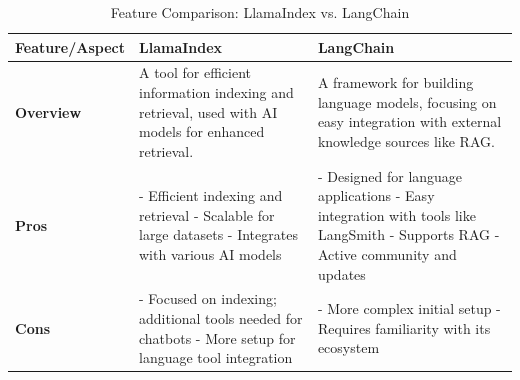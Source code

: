 \begin{table}[H]
\label{tab:FC}
\begin{center}
\caption{Feature Comparison: LlamaIndex vs. LangChain}
\begin{tabular}{|l|p{5cm}|p{5cm}|}
\hline
 \rowcolor[gray]{0.8} \textbf{Feature/Aspect} & \textbf{LlamaIndex} & \textbf{LangChain} \\
\hline
\textbf{Overview} & A tool for efficient information indexing and retrieval, used with AI models for enhanced retrieval. & A framework for building language models, focusing on easy integration with external knowledge sources like RAG. \\
\hline
\textbf{Pros} & - Efficient indexing and retrieval \newline - Scalable for large datasets \newline - Integrates with various AI models & - Designed for language applications \newline - Easy integration with tools like LangSmith \newline - Supports RAG \newline - Active community and updates \\
\hline
\textbf{Cons} & - Focused on indexing; additional tools needed for chatbots \newline - More setup for language tool integration & - More complex initial setup \newline - Requires familiarity with its ecosystem \\
\hline
\end{tabular}
\end{center}
\end{table} 



